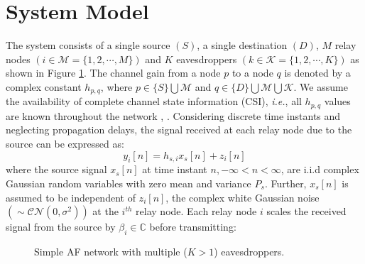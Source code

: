 \documentclass[journal,,draftclsnofoot letterpaper, onecolumn]{IEEEtran}
\begin{document}
\section{System Model}
\label{sec:model}
The system consists of a single source $(S)$, a single destination $(D)$, $M$ relay nodes $(i \in \mathcal{M}=\{1,2,\cdots,M\})$ and $K$ eavesdroppers $(k \in \mathcal{K}=\{1,2,\cdots,K\})$ as shown in Figure \ref{fig:model}. The channel gain from a node $p$ to a node $q$ is denoted by a complex constant $h_{p,q}$, where $p\in \{S\}\bigcup \mathcal{M}$ and $q \in \{D\} \bigcup \mathcal{M} \bigcup \mathcal{K}$. We assume the availability of complete channel state information 
(CSI), \textit{i.e.}, all $h_{p,q}$ values are known throughout the network \cite{dong}, \cite{sarma}. Considering  discrete time instants and neglecting propagation delays, the signal received at each relay node due to the source can be expressed as:
\begin{equation}\label{eq:rel}
y_i[n]= h_{s,i}x_s[n] + z_i[n]
\end{equation} 
where the source signal $x_s[n]$ at time instant $n, -\infty < n < \infty$, are i.i.d complex Gaussian random variables with zero mean and variance $P_s$. 
Further, $x_s[n]$ is assumed to be independent of $z_i[n]$, the complex white Gaussian noise $(\sim \mathcal{CN}(0,\sigma^2))$ at the $i^{th}$ relay node. Each relay node $i$ scales the received signal from the source by $\beta_i \in \mathbb{C}$ before transmitting: \begin{figure}[!t]
\centering
{}
\caption{Simple AF network with multiple ($K > 1$) eavesdroppers.}
\label{fig:model}
\end{figure}
\end{document}
